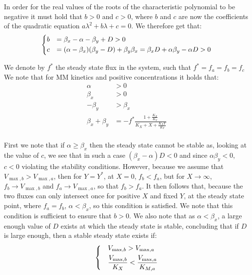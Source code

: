  In order for the real values of the roots of the characteristic polynomial to be negative it must hold that $b>0$ and $c>0$, where $b$ and $c$ are now the coefficients of the quadratic equation $a\lambda^2+b\lambda+c=0$.
We therefore get that:
\begin{align*}
    \begin{dcases}
        b & =\beta_x-\alpha-\beta_y+D>0\\
        c & =(\alpha-\beta_x)(\beta_y-D)+\beta_y\beta_x=\beta_x D+\alpha\beta_y-\alpha D >0
    \end{dcases}
\end{align*}

We denote by $f^*$ the steady state flux in the system, such that $f^*=f_a=f_b=f_c$
We note that for MM kinetics and positive concentrations it holds that:
    \begin{align*}
        \alpha & >0 \\
        \beta_x & >0 \\
        -\beta_y & >\beta_x \\
        \beta_x+\beta_y & = -f^*\frac{1+\frac{K_X}{K_Y}}{K_X+X+\frac{K_XY}{K_Y}}\\
    \end{align*}

First we note that if $\alpha\geq\beta_x$ then the steady state cannot be stable as, looking at the value of $c$, we see that in such a case $(\beta_x -\alpha) D<0$ and since $\alpha\beta_y<0$, $c<0$ violating the stability conditions.
However, because we assume that $V_{\max,b}>V_{\max,a}$, then for $Y=Y^*$, at $X=0$, $f_b<f_a$, but for $X\rightarrow\infty$, $f_b\rightarrow V_{\max,b}$ and $f_a \rightarrow V_{\max,a}$, so that $f_b>f_a$.
It then follows that, because the two fluxes can only intersect once for positive $X$ and fixed $Y$, at the steady state point, where $f_a=f_b$, $\alpha<\beta_x$, so this condition is satisfied.
We note that this condition is sufficient to ensure that $b>0$.
We also note that as $\alpha<\beta_x$, a large enough value of $D$ exists at which the steady state is stable, concluding that if $D$ is large enough, then a stable steady state exists if:
\begin{align*}
    \begin{dcases}
        &V_{\max,b}>V_{\max,a} \\
        &\frac{V_{\max,b}}{K_X}<\frac{V_{\max,a}}{K_{M,a}}
    \end{dcases}
\end{align*}

